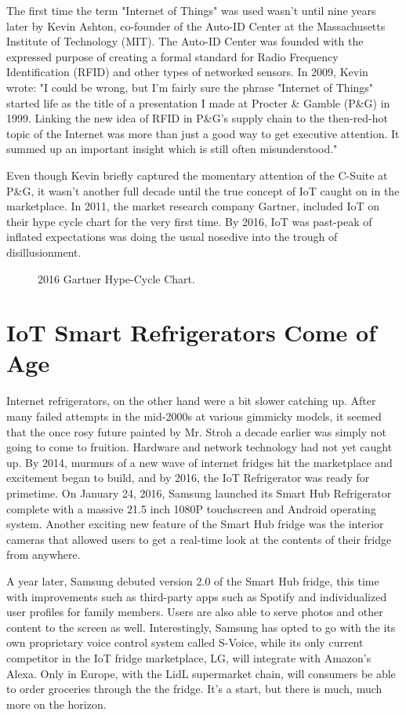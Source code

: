 \documentclass[sigconf]{acmart}
\begin{document}
The first time the term "Internet of Things" was used wasn't until nine years later by Kevin Ashton, co-founder of the Auto-ID Center at the Massachusetts Institute of Technology (MIT). The Auto-ID Center was founded with the expressed purpose of creating a formal standard for Radio Frequency Identification (RFID) and other types of networked sensors. In 2009, Kevin wrote\cite{Ashton01}: "I could be wrong, but I'm fairly sure the phrase "Internet of Things" started life as the title of a presentation I made at Procter \& Gamble (P\&G) in 1999. Linking the new idea of RFID in P\&G's supply chain to the then-red-hot topic of the Internet was more than just a good way to get executive attention. It summed up an important insight which is still often misunderstood."
\par
Even though Kevin briefly captured the momentary attention of the C-Suite at P\&G, it wasn't another full decade until the true concept of IoT caught on in the marketplace. In 2011, the market research company Gartner, included IoT on their hype cycle chart for the very first time. By 2016, IoT was past-peak of inflated expectations was doing the usual nosedive into the trough of disillusionment\cite{Gartner2017}.

\begin{figure}
  \caption{2016 Gartner Hype-Cycle Chart.}
  \label{fig:Gartner2016}
\end{figure}

\section{IoT Smart Refrigerators Come of Age}

Internet refrigerators, on the other hand were a bit slower catching up. After many failed attempts in the mid-2000s at various gimmicky models, it seemed that the once rosy future painted by Mr. Stroh a decade earlier was simply not going to come to fruition. Hardware and network technology had not yet caught up. By 2014, murmurs of a new wave of internet fridges hit the marketplace and excitement began to build, and by 2016, the IoT Refrigerator was ready for primetime. On January 24, 2016, Samsung launched its Smart Hub Refrigerator complete with a massive 21.5 inch 1080P touchscreen and Android operating system. Another exciting new feature of the Smart Hub fridge was the interior cameras that allowed users to get a real-time look at the contents of their fridge from anywhere\cite{PocketLint2016}.
\par
A year later, Samsung debuted version 2.0 of the Smart Hub fridge, this time with improvements such as third-party apps such as Spotify and individualized user profiles for family members. Users are also able to serve photos and other content to the screen as well. Interestingly, Samsung has opted to go with the its own proprietary voice control system called S-Voice, while its only current competitor in the IoT fridge marketplace, LG, will integrate with Amazon's Alexa. Only in Europe, with the LidL supermarket chain, will consumers be able to order groceries through the the fridge. It's a start, but there is much, much more on the horizon\cite{PocketLint2017}.
\end{document}
